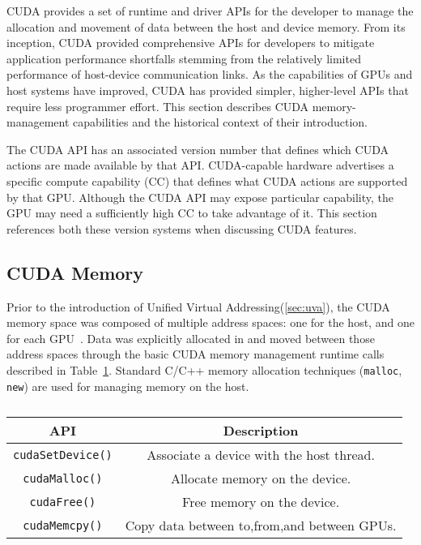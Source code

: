 CUDA provides a set of runtime and driver APIs for the developer to manage the allocation and movement of data between the host and device memory.
From its inception, CUDA provided comprehensive APIs for developers to mitigate application performance shortfalls stemming from the relatively limited performance of host-device communication links.
As the capabilities of GPUs and host systems have improved, CUDA has provided simpler, higher-level APIs that require less programmer effort.
This section describes CUDA memory-management capabilities and the historical context of their introduction.

The CUDA API has an associated version number that defines which CUDA actions are made available by that API.
CUDA-capable hardware advertises a specific compute capability (CC) that defines what CUDA actions are supported by that GPU.
Although the CUDA API may expose particular capability, the GPU may need a sufficiently high CC to take advantage of it.
This section references both these version systems when discussing CUDA features.

\subsection{CUDA Memory}

Prior to the introduction of Unified Virtual Addressing(\ref{sec:uva}), the CUDA memory space was composed of multiple address spaces: one for the host, and one for each GPU~\cite{schroeder2011peer}.
Data was explicitly allocated in and moved between those address spaces through the basic CUDA memory management runtime calls described in Table~\ref{tab:cuda-basic-apis}.
Standard C/C++ memory allocation techniques (\texttt{malloc}, \texttt{new}) are used for managing memory on the host.

\begin{table}[h]
	\centering
	\caption[Basic CUDA Memory-management APIs]{}
	\label{tab:cuda-basic-apis}
	\begin{tabular}{|c|c|}
		\hline
		\textbf{API}             & \textbf{Description}                        \\ \hline
		\texttt{cudaSetDevice()} & Associate a device with the host thread.    \\ \hline
		\texttt{cudaMalloc()}    & Allocate memory on the device.              \\ \hline
		\texttt{cudaFree()}      & Free memory on the device.                  \\ \hline
		\texttt{cudaMemcpy()}    & Copy data between to,from,and between GPUs. \\ \hline
	\end{tabular}
\end{table}

